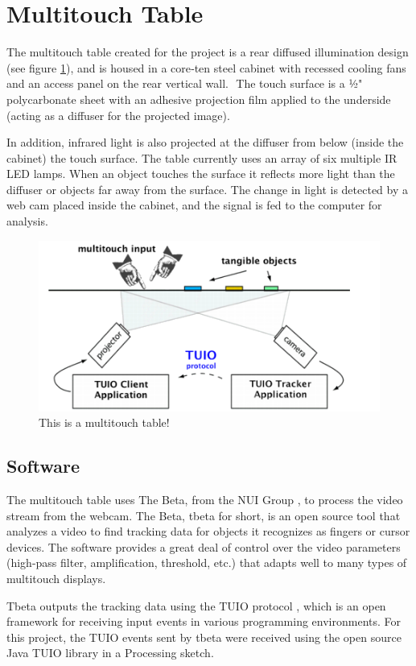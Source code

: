 \section{Multitouch Table}
The multitouch table created for the project is a rear diffused illumination design (see figure \ref{fig:mtdiagram}), and is housed in a core‐ten steel cabinet with recessed cooling fans and an access panel on the rear vertical wall.  The touch surface is a 1⁄2" polycarbonate sheet with an adhesive projection film applied to the underside (acting as a diffuser for the projected image).  

In addition, infrared light is also projected at the diffuser from below (inside the cabinet) the touch surface. The table currently uses an array of six multiple IR LED lamps. When an object touches the surface it reflects more light than the diffuser or objects far away from the surface. The change in light is detected by a web cam placed inside the cabinet, and the signal is fed to the computer for analysis.

\begin{figure}[htp]\centering
  \includegraphics[width=.8\textwidth]{images/mt-diagram.png}
  \caption{This is a multitouch table!}\label{fig:mtdiagram}
\end{figure}
\subsection{Software}
The multitouch table uses The Beta, from the NUI Group \cite{NUI}, to process the video stream from the webcam. The Beta, tbeta for short, is an open source tool that analyzes a video to find tracking data for objects it recognizes as fingers or cursor devices. The software provides a great deal of control over the video parameters (high-pass filter, amplification, threshold, etc.) that adapts well to many types of multitouch displays.

Tbeta outputs the tracking data using the TUIO protocol \cite{TUIO}, which is an open framework for receiving input events in various programming environments. For this project, the TUIO events sent by tbeta were received using the open source Java TUIO library in a Processing sketch. 
